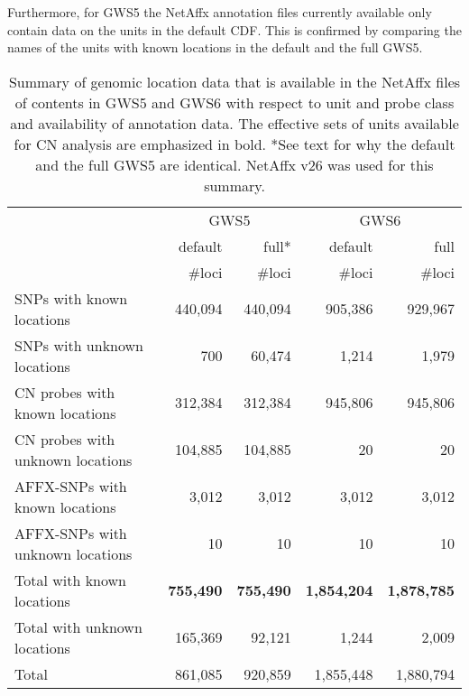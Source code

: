\documentclass[10pt,a4paper]{article}
\newcommand{\GWSFive}{GWS5\xspace}
\newcommand{\GWSSix}{GWS6\xspace}
\begin{document}
Furthermore, for GWS5 the NetAffx annotation files currently available only contain data on the units in the default CDF.  This is confirmed by comparing the names of the units with known locations in the default and the full GWS5.

\begin{table}[hp]
\begin{center}
\begin{tabular}{|l||rr||rr|}
\hline
     & \multicolumn{2}{c||}{\GWSFive} & \multicolumn{2}{c|}{\GWSSix} \\
     & default & full* & default & full \\
     & \#loci & \#loci & \#loci & \#loci \\
\hline
\hline
SNPs with known locations        & 440,094 &  440,094  &   905,386 &   929,967 \\
SNPs with unknown locations      &     700 &   60,474  &     1,214 &     1,979 \\
\hline
CN probes with known locations   & 312,384 &  312,384  &   945,806 &   945,806 \\
CN probes with unknown locations & 104,885 &  104,885  &        20 &        20 \\
\hline
AFFX-SNPs with known locations   &   3,012 &    3,012  &     3,012 &     3,012 \\
AFFX-SNPs with unknown locations &      10 &       10  &        10 &        10 \\
\hline
Total with known locations       & \textbf{755,490} & \textbf{755,490} & \textbf{1,854,204}  & \textbf{1,878,785} \\
Total with unknown locations     & 165,369 &   92,121  &    1,244  &     2,009 \\
\hline
Total                            & 861,085 &  920,859  & 1,855,448 & 1,880,794 \\
\hline
\end{tabular}
\end{center}
\caption{Summary of genomic location data that is available in the NetAffx files of contents in GWS5 and GWS6 with respect to unit and probe class and availability of annotation data.  The effective sets of units available for CN analysis are emphasized in bold.  *See text for why the default and the full GWS5 are identical.  NetAffx v26 was used for this summary.}
\label{tblGenomicLocation}
\end{table}
\end{document}
